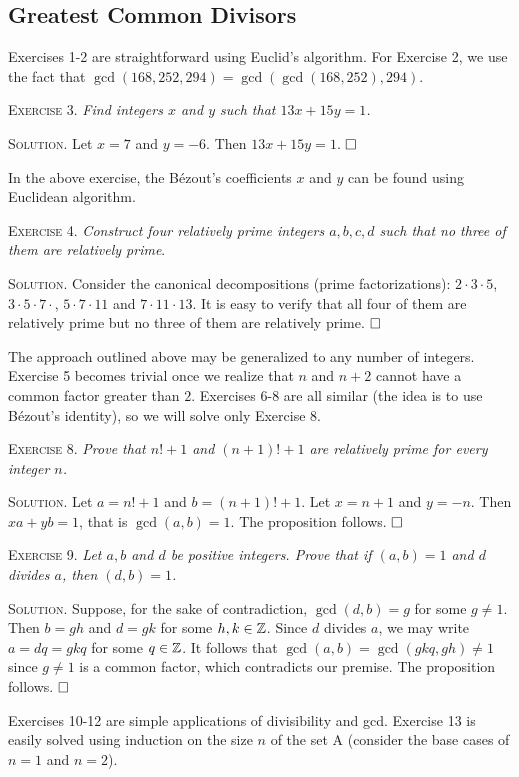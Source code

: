 \documentclass[11pt, leqno]{article}
\newcommand{\done}{\ensuremath{\hfill\square}}
\begin{document}
\subsection{Greatest Common Divisors}

Exercises 1-2 are straightforward using Euclid's algorithm. For Exercise 2, we use the fact that $\gcd(168, 252, 294) = \gcd(\gcd(168, 252), 294)$.

\textsc{Exercise 3}. \emph{Find integers $x$ and $y$ such that $13x + 15y = 1$.}

\textsc{Solution}. Let $x = 7$ and $y = -6$. Then $13x + 15y = 1$. \done

In the above exercise, the B\'ezout's coefficients $x$ and $y$ can be found using Euclidean algorithm.

\textsc{Exercise 4}. \emph{Construct four relatively prime integers $a,b,c,d$ such that no three of them are relatively prime}.

\textsc{Solution}. Consider the canonical decompositions (prime factorizations): $2\cdot3\cdot5$,  $3\cdot5\cdot7\cdot$, $5\cdot7\cdot11$ and $7\cdot11\cdot13$. It is easy to verify that all four of them are relatively prime but no three of them are relatively prime. \done

The approach outlined above may be generalized to any number of integers. Exercise 5 becomes trivial once we realize that $n$ and $n+2$ cannot have a common factor greater than $2$. Exercises 6-8 are all similar (the idea is to use B\'ezout's identity), so we will solve only Exercise 8.

\textsc{Exercise 8}. \emph{Prove that $n!+1$ and $(n+1)!+1$ are relatively prime for every integer $n$.}

\textsc{Solution}. Let $a = n!+1$ and $b = (n+1)!+1$. Let $x = n+1$ and $y = -n$. Then $xa + yb = 1$, that is $\gcd(a,b)=1$. The proposition follows. \done

\textsc{Exercise 9}. \emph{Let $a,b$ and $d$ be positive integers. Prove that if $(a,b)=1$ and $d$ divides $a$, then $(d,b)=1$.}

\textsc{Solution}. Suppose, for the sake of contradiction, $\gcd(d,b) = g$ for some $g\ne 1$. Then $b=gh$ and $d=gk$ for some $h,k \in \mathbb{Z}$. Since $d$ divides $a$, we may write $a = dq = gkq$ for some $q\in\mathbb{Z}$. It follows that $\gcd(a,b) = \gcd(gkq, gh) \ne 1$ since $g\ne 1$ is a common factor, which contradicts our premise. The proposition follows. \done

Exercises 10-12 are simple applications of divisibility and gcd. Exercise 13 is easily solved using induction on the size $n$ of the set A (consider the base cases of $n=1$ and $n=2$).
\end{document}
